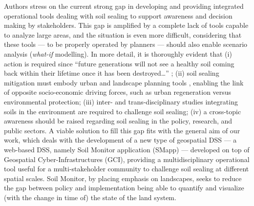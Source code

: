 \documentclass[APA,LATO1COL,doublespace]{WileyNJD-v2}
\newcommand{\toberevised}[1]{\emph{\textcolor{red}{#1}}} %
\newcommand{\reviewer}[1]{\emph{\textcolor{cyan}{#1}}}   %
\begin{document}
Authors stress on the current
strong gap in developing and providing integrated operational tools 
dealing with soil sealing 
to support awareness and decision making by stakeholders.
This gap is amplified by a complete lack of tools 
capable to analyze large areas, and the situation is even more difficult, considering that these tools --- to be properly operated by planners --- should also enable scenario analysis (\textit{what-if} modelling).
In more detail, it is thoroughly evident that 
(i) action is required since ``future generations will not see a healthy soil coming back within their lifetime once it has been destroyed\dots'' \citep{SWD12}; 
(ii) soil sealing mitigation must embody urban and landscape planning tools \citep{Artmann14}, enabling the link of opposite socio-economic driving forces, such as urban regeneration versus environmental protection; 
(iii) inter- and trans-disciplinary studies integrating soils in the environment are required to challenge soil sealing;
(iv) a cross-topic awareness should be raised regarding soil sealing in the policy, research, and public sectors.
A viable solution to fill this gap fits with the general aim of our work, which deals with the development of
a new type of geospatial DSS --- a web-based DSS, namely Soil Monitor application (SMapp) --- developed on top of Geospatial Cyber-Infrastructures (GCI), providing a multidisciplinary operational tool useful for a multi-stakeholder community to challenge soil sealing at different spatial scales.
Soil Monitor, by placing emphasis on landscapes, seeks to reduce the gap between policy and implementation being able to quantify and visualize (with the change in time of) the state of the land system.

\end{document}
